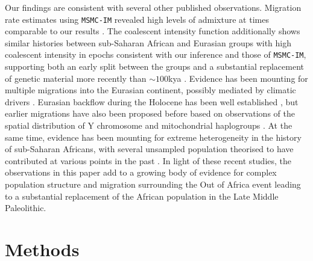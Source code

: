 Our findings are consistent with several other published observations. Migration rate estimates using {\tt MSMC-IM} revealed high levels of admixture at times comparable to our results \cite{Wang2019a}. The coalescent intensity function additionally shows similar histories between sub-Saharan African and Eurasian groups with high coalescent intensity in epochs consistent with our inference and those of {\tt MSMC-IM}, supporting both an early split between the groups and a substantial replacement of genetic material more recently than $\sim100$kya \cite{Albers2019}. Evidence has been mounting for multiple migrations into the Eurasian continent, possibly mediated by climatic drivers \cite{Timmermann2016, Pagani2016}. Eurasian backflow during the Holocene has been well established \cite{Lopez2015, GallegoLlorente2015}, but earlier migrations have also been proposed before based on observations of the spatial distribution of Y chromosome and mitochondrial haplogroups \cite{Altheide1997, Hammer1998, Cruciani2002, Chandrasekar2007, Cabrera2018, Hervella2016, Haber2019}. At the same time, evidence has been mounting for extreme heterogeneity in the history of sub-Saharan Africans, with several unsampled population theorised to have contributed at various points in the past \cite{Lipson2019, Durvasula2019, Speidel2019}. In light of these recent studies, the observations in this paper add to a growing body of evidence for complex population structure and migration surrounding the Out of Africa event leading to a substantial replacement of the African population in the Late Middle Paleolithic.  


\section{Methods}


